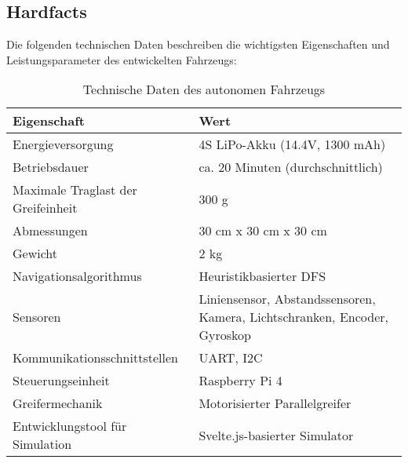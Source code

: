 \documentclass[main.tex]{subfiles} %
\begin{document}

\subsection{Hardfacts}

Die folgenden technischen Daten beschreiben die wichtigsten Eigenschaften und
Leistungsparameter des entwickelten Fahrzeugs:

\begin{table}[h!]
    \centering
    \renewcommand{\arraystretch}{1.5}
    \begin{tabular}{|l|p{7cm}|}
        \hline
        \textbf{Eigenschaft}               & \textbf{Wert}                                                             \\ \hline
        Energieversorgung                  & 4S LiPo-Akku (14.4V, 1300 mAh)                                            \\ \hline
        Betriebsdauer                      & ca. 20 Minuten (durchschnittlich)                                         \\ \hline
        Maximale Traglast der Greifeinheit & 300 g                                                                     \\ \hline %
        Abmessungen                        & 30 cm x 30 cm x 30 cm                                                     \\ \hline
        Gewicht                            & 2 kg                                                                    \\ \hline
        Navigationsalgorithmus             & Heuristikbasierter DFS                                                    \\ \hline
        Sensoren                           & Liniensensor, Abstandssensoren, Kamera, Lichtschranken, Encoder, Gyroskop \\ \hline
        Kommunikationsschnittstellen       & UART, I2C                                                                 \\ \hline
        Steuerungseinheit                  & Raspberry Pi 4                                                            \\ \hline %
        Greifermechanik                    & Motorisierter Parallelgreifer                                             \\ \hline
        Entwicklungstool für Simulation    & Svelte.js-basierter Simulator                                             \\ \hline
    \end{tabular}
    \caption{Technische Daten des autonomen Fahrzeugs}
    \label{tab:hardfacts}
\end{table}
\end{document}
